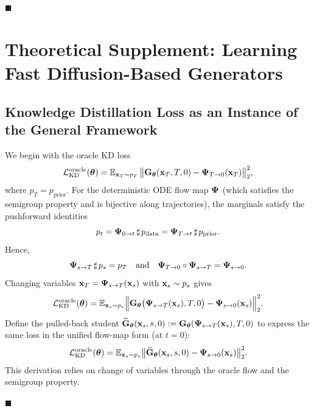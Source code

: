 \hfill$\blacksquare$



\clearpage
\newpage


\section{Theoretical Supplement: Learning Fast Diffusion-Based Generators}\label{app-sec:flow-map}

\subsection{Knowledge Distillation Loss as an Instance of the General Framework }

We begin with the oracle KD loss
\[
\mathcal{L}_{\mathrm{KD}}^{\text{oracle}}({\bm{\theta}})
=\mathbb{E}_{{\mathbf{x}}_T\sim p_T}\,
\big\|{\mathbf{G}}_{\bm{\theta}}({\mathbf{x}}_T,T,0)-{\bm{\Psi}}_{T\to 0}({\mathbf{x}}_T)\big\|_2^2,
\]
where $p_T = p_{\mathrm{prior}}$. For the deterministic ODE flow map ${\bm{\Psi}}$ (which satisfies the semigroup property and is bijective along trajectories), the marginals satisfy the pushforward identities
\[
p_t
= {\bm{\Psi}}_{0\to t}\,\sharp\,p_{\mathrm{data}}
= {\bm{\Psi}}_{T\to t}\,\sharp\,p_{\mathrm{prior}}.
\]
Hence,
\[
{\bm{\Psi}}_{s\to T}\,\sharp\,p_s=p_T
\quad\text{and}\quad
{\bm{\Psi}}_{T\to 0}\circ{\bm{\Psi}}_{s\to T}={\bm{\Psi}}_{s\to 0}.
\]
Changing variables ${\mathbf{x}}_T={\bm{\Psi}}_{s\to T}({\mathbf{x}}_s)$ with ${\mathbf{x}}_s\sim p_s$ gives
\[
\mathcal{L}_{\mathrm{KD}}^{\text{oracle}}({\bm{\theta}})
= \mathbb{E}_{{\mathbf{x}}_s\sim p_s} 
\Big\|{\mathbf{G}}_{\bm{\theta}} \big({\bm{\Psi}}_{s\to T}({\mathbf{x}}_s),T,0\big)
- {\bm{\Psi}}_{s\to 0}({\mathbf{x}}_s)\Big\|_2^2.
\]
Define the pulled-back student $\widetilde{{\mathbf{G}}}_{\bm{\theta}}({\mathbf{x}}_s,s,0):=
{\mathbf{G}}_{\bm{\theta}}({\bm{\Psi}}_{s\to T}({\mathbf{x}}_s),T,0)$ to express the same loss in the unified flow-map form (at $t=0$):
\begin{align*}
\mathcal{L}_{\mathrm{KD}}^{\text{oracle}}({\bm{\theta}})
= \mathbb{E}_{{\mathbf{x}}_s\sim p_s} 
\big\|\widetilde{{\mathbf{G}}}_{\bm{\theta}}({\mathbf{x}}_s,s,0)-{\bm{\Psi}}_{s\to 0}({\mathbf{x}}_s)\big\|_2^2.
\end{align*}
This derivation relies on change of variables through the oracle flow and the semigroup property.

\hfill$\blacksquare$

